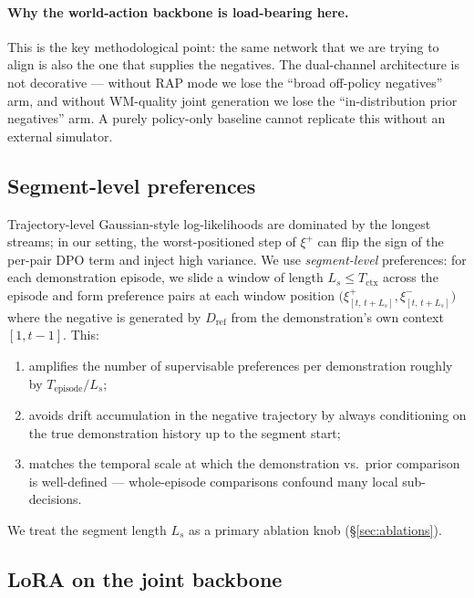 \documentclass[11pt]{article}
\newcommand{\Dref}{D_{\mathrm{ref}}}
\begin{document}
\paragraph{Why the world-action backbone is load-bearing here.}
This is the key methodological point: the same network that we are trying to align is also the one that supplies the negatives. The dual-channel architecture is not decorative --- without RAP mode we lose the ``broad off-policy negatives'' arm, and without WM-quality joint generation we lose the ``in-distribution prior negatives'' arm. A purely policy-only baseline cannot replicate this without an external simulator.

\subsection{Segment-level preferences}
\label{sec:segments}

Trajectory-level Gaussian-style log-likelihoods are dominated by the longest streams; in our setting, the worst-positioned step of $\xi^+$ can flip the sign of the per-pair DPO term and inject high variance. We use \emph{segment-level} preferences: for each demonstration episode, we slide a window of length $L_s \leq T_{\mathrm{ctx}}$ across the episode and form preference pairs at each window position $\big(\xi^+_{[t,\,t+L_s]}, \xi^-_{[t,\,t+L_s]}\big)$ where the negative is generated by $\Dref$ from the demonstration's own context $[1,t-1]$. This:

\begin{enumerate}
    \item amplifies the number of supervisable preferences per demonstration roughly by $T_{\mathrm{episode}} / L_s$;
    \item avoids drift accumulation in the negative trajectory by always conditioning on the true demonstration history up to the segment start;
    \item matches the temporal scale at which the demonstration vs.\ prior comparison is well-defined --- whole-episode comparisons confound many local sub-decisions.
\end{enumerate}

We treat the segment length $L_s$ as a primary ablation knob (\S\ref{sec:ablations}).

\subsection{LoRA on the joint backbone}
\label{sec:lora}
\end{document}
